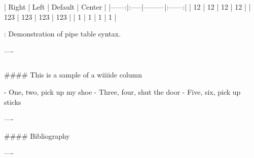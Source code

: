 \documentclass{beamer}
\begin{document}
\begin{frame}[fragile]
\begin{columns}[T]
\begin{column}{.46\textwidth}
\begin{markdown}
| Right | Left | Default | Center |
|------:|:-----|---------|:------:| 
|  12   |  12  |  12     |   12   | 
| 123   |  123 |   123   |  123   | 
|   1   |    1 |     1   |    1   | 

  : Demonstration of pipe table syntax.

----

\end{markdown}
\end{column}
\end{columns}

\begin{markdown}

#### This is a sample of a wiiiide column

- One, two, pick up my shoe
- Three, four, shut the door
- Five, six, pick up sticks

----

#### Bibliography




----

\end{markdown}

\end{frame}
\end{document}
